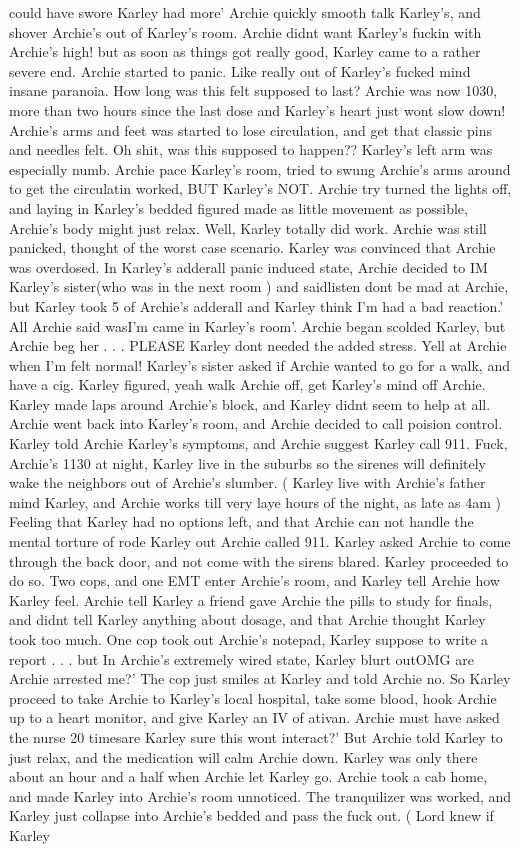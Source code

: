\documentclass[12pt]{book}
\begin{document}
could have swore Karley had more' Archie quickly smooth talk Karley's, and shover Archie's out of Karley's room. Archie didnt want Karley's fuckin with Archie's high! but as soon as things got really good, Karley came to a rather severe end. Archie started to panic. Like really out of Karley's fucked mind insane paranoia. How long was this felt supposed to last? Archie was now 1030, more than two hours since the last dose and Karley's heart just wont slow down! Archie's arms and feet was started to lose circulation, and get that classic pins and needles felt. Oh shit, was this supposed to happen?? Karley's left arm was especially numb. Archie pace Karley's room, tried to swung Archie's arms around to get the circulatin worked, BUT Karley's NOT. Archie try turned the lights off, and laying in Karley's bedded figured made as little movement as possible, Archie's body might just relax. Well, Karley totally did work. Archie was still panicked, thought of the worst case scenario. Karley was convinced that Archie was overdosed. In Karley's adderall panic induced state, Archie decided to IM Karley's sister(who was in the next room ) and saidlisten dont be mad at Archie, but Karley took 5 of Archie's adderall and Karley think I'm had a bad reaction.' All Archie said wasI'm came in Karley's room'. Archie began scolded Karley, but Archie beg her . . .  PLEASE Karley dont needed the added stress. Yell at Archie when I'm felt normal! Karley's sister asked if Archie wanted to go for a walk, and have a cig. Karley figured, yeah walk Archie off, get Karley's mind off Archie. Karley made laps around Archie's block, and Karley didnt seem to help at all. Archie went back into Karley's room, and Archie decided to call poision control. Karley told Archie Karley's symptoms, and Archie suggest Karley call 911. Fuck, Archie's 1130 at night, Karley live in the suburbs so the sirenes will definitely wake the neighbors out of Archie's slumber. ( Karley live with Archie's father mind Karley, and Archie works till very laye hours of the night, as late as 4am ) Feeling that Karley had no options left, and that Archie can not handle the mental torture of rode Karley out Archie called 911. Karley asked Archie to come through the back door, and not come with the sirens blared. Karley proceeded to do so. Two cops, and one EMT enter Archie's room, and Karley tell Archie how Karley feel. Archie tell Karley a friend gave Archie the pills to study for finals, and didnt tell Karley anything about dosage, and that Archie thought Karley took too much. One cop took out Archie's notepad, Karley suppose to write a report . . .  but In Archie's extremely wired state, Karley blurt outOMG are Archie arrested me?' The cop just smiles at Karley and told Archie no. So Karley proceed to take Archie to Karley's local hospital, take some blood, hook Archie up to a heart monitor, and give Karley an IV of ativan. Archie must have asked the nurse 20 timesare Karley sure this wont interact?' But Archie told Karley to just relax, and the medication will calm Archie down. Karley was only there about an hour and a half when Archie let Karley go. Archie took a cab home, and made Karley into Archie's room unnoticed. The tranquilizer was worked, and Karley just collapse into Archie's bedded and pass the fuck out. ( Lord knew if Karley 
\end{document}

